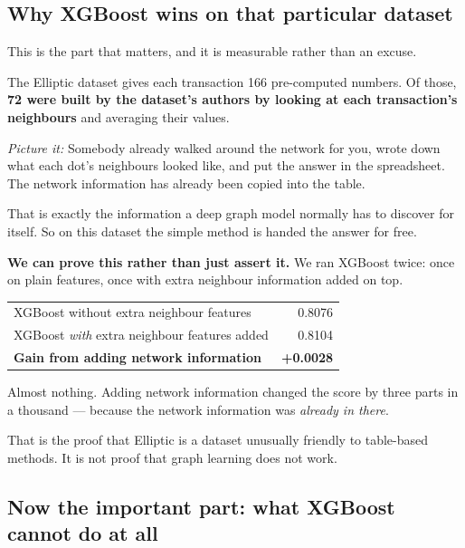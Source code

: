 \documentclass[11pt,a4paper]{article}
\newcommand{\pw}[1]{\textit{\textcolor{accent}{Picture it:}} #1}
\begin{document}
\subsection{Why XGBoost wins on that particular dataset}

This is the part that matters, and it is measurable rather than an excuse.

The Elliptic dataset gives each transaction 166 pre-computed numbers. Of those,
\textbf{72 were built by the dataset's authors by looking at each transaction's
neighbours} and averaging their values.

\pw{Somebody already walked around the network for you, wrote down what each
dot's neighbours looked like, and put the answer in the spreadsheet. The
network information has already been copied into the table.}

That is exactly the information a deep graph model normally has to discover for
itself. So on this dataset the simple method is handed the answer for free.

\begin{keybox}
\textbf{We can prove this rather than just assert it.} We ran XGBoost twice: once
on plain features, once with extra neighbour information added on top.

\begin{center}\small
\begin{tabular}{@{}lr@{}}
\toprule
XGBoost without extra neighbour features & 0.8076 \\
XGBoost \emph{with} extra neighbour features added & 0.8104 \\
\midrule
\textbf{Gain from adding network information} & \textbf{+0.0028} \\
\bottomrule
\end{tabular}
\end{center}

Almost nothing. Adding network information changed the score by three parts in a
thousand --- because the network information was \emph{already in there}.

That is the proof that Elliptic is a dataset unusually friendly to table-based
methods. It is not proof that graph learning does not work.
\end{keybox}

\subsection{Now the important part: what XGBoost cannot do at all}
\end{document}

